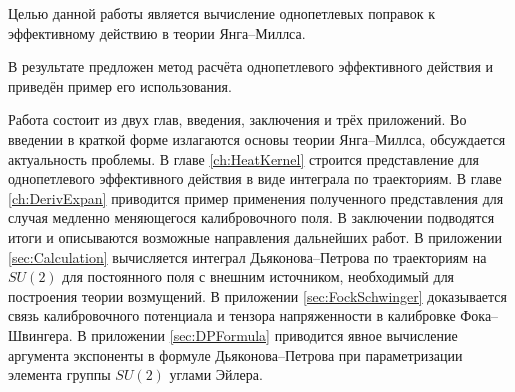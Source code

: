 
Целью данной работы является вычисление однопетлевых поправок к эффективному действию в теории Янга--Миллса.

В результате предложен метод расчёта однопетлевого эффективного действия и приведён пример его использования.
	
Работа состоит из двух глав, введения, заключения и трёх приложений.
Во введении в краткой форме излагаются основы теории Янга--Миллса, обсуждается актуальность проблемы.
В главе \ref{ch:HeatKernel} строится представление для однопетлевого эффективного действия в виде интеграла по траекториям.
В главе \ref{ch:DerivExpan} приводится пример применения полученного представления для случая медленно меняющегося калибровочного поля.
В заключении подводятся итоги и описываются возможные направления дальнейших работ.
В приложении \ref{sec:Calculation} вычисляется интеграл Дьяконова--Петрова по траекториям на $SU(2)$ для постоянного поля с внешним источником, необходимый для построения теории возмущений.
В приложении \ref{sec:FockSchwinger} доказывается связь калибровочного потенциала и тензора напряженности в калибровке Фока--Швингера.
В приложении \ref{sec:DPFormula} приводится явное вычисление аргумента экспоненты в формуле Дьяконова--Петрова при параметризации элемента группы $SU(2)$ углами Эйлера.